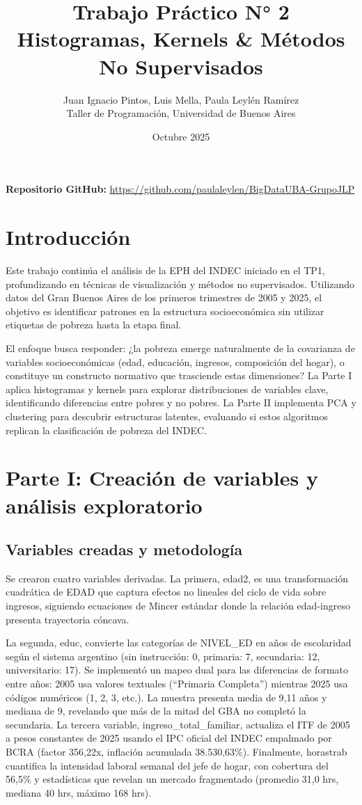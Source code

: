 \documentclass[11pt,a4paper]{article}
\title{\textbf{Trabajo Práctico N° 2 \\ Histogramas, Kernels \& Métodos No Supervisados}}
\author{
    Juan Ignacio Pintos, Luis Mella, Paula Leylén Ramírez \\
    Taller de Programación, Universidad de Buenos Aires    
}
\date{Octubre 2025}
\begin{document}
\maketitle

\noindent\textbf{Repositorio GitHub:} \url{https://github.com/paulaleylen/BigDataUBA-GrupoJLP}

\section{Introducción}

Este trabajo continúa el análisis de la EPH del INDEC iniciado en el TP1, profundizando en técnicas de visualización y métodos no supervisados. Utilizando datos del Gran Buenos Aires de los primeros trimestres de 2005 y 2025, el objetivo es identificar patrones en la estructura socioeconómica sin utilizar etiquetas de pobreza hasta la etapa final.

El enfoque busca responder: ¿la pobreza emerge naturalmente de la covarianza de variables socioeconómicas (edad, educación, ingresos, composición del hogar), o constituye un constructo normativo que trasciende estas dimensiones? La Parte I aplica histogramas y kernels para explorar distribuciones de variables clave, identificando diferencias entre pobres y no pobres. La Parte II implementa PCA y clustering para descubrir estructuras latentes, evaluando si estos algoritmos replican la clasificación de pobreza del INDEC\@.

\section{Parte I: Creación de variables y análisis exploratorio}

\subsection{Variables creadas y metodología}

Se crearon cuatro variables derivadas. La primera, edad2, es una transformación cuadrática de EDAD que captura efectos no lineales del ciclo de vida sobre ingresos, siguiendo ecuaciones de Mincer estándar donde la relación edad-ingreso presenta trayectoria cóncava.

La segunda, educ, convierte las categorías de NIVEL\_ED en años de escolaridad según el sistema argentino (sin instrucción: 0, primaria: 7, secundaria: 12, universitario: 17). Se implementó un mapeo dual para las diferencias de formato entre años: 2005 usa valores textuales (``Primaria Completa'') mientras 2025 usa códigos numéricos (1, 2, 3, etc.). La muestra presenta media de 9,11 años y mediana de 9, revelando que más de la mitad del GBA no completó la secundaria. La tercera variable, ingreso\_total\_familiar, actualiza el ITF de 2005 a pesos constantes de 2025 usando el IPC oficial del INDEC empalmado por BCRA (factor 356,22x, inflación acumulada 38.530,63\%). Finalmente, horastrab cuantifica la intensidad laboral semanal del jefe de hogar, con cobertura del 56,5\% y estadísticas que revelan un mercado fragmentado (promedio 31,0 hrs, mediana 40 hrs, máximo 168 hrs).
\end{document}
